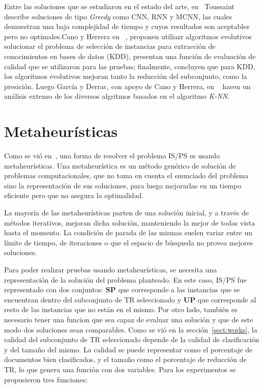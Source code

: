 \documentclass{ci5652}
\begin{document}
Entre las soluciones que se estudiaron en el estado del arte, en~\cite{toussaint2002proximity} Toussaint describe soluciones de tipo \textit{Greedy} como CNN, RNN y MCNN, las cuales demuestran una baja complejidad de tiempo y cuyos resultados son aceptables pero no optimales.Cano y Herrera en ~\cite{1255391}, proponen utiliazr algoritmos evolutivos solucionar el problema de selección de instancias para extracción de conocimientos en bases de datos (KDD), presentan una función de evaluación de calidad que se utilizaron para las pruebas; finalmente, concluyen que para KDD, los algoritmos evolutivos mejoran tanto la reducción del subconjunto, como la presición. Luego García y Derrac, con apoyo de Cano y Herrera, en ~\cite{garcia2012prototype} hacen un análisis extenso de los diversos algritmos basados en el algoritmo \textit{K-NN}.

\section{Metaheurísticas}
\label{sect:meta}

Como se vió en~\cite{1255391}, una forma de resolver el problema IS/PS es usando metaheurísticas. Una metaheurística es un método genérico de solución de problemas computacionales, que no toma en cuenta el enunciado del problema sino la representación de sus soluciones, para luego mejorarlas en un tiempo eficiente pero que no asegura la optimalidad.

La mayoría de las metaheurísticas parten de una solución inicial, y a través de métodos iterativos, mejoran dicha solución, manteniendo la mejor de todas vista hasta el momento. La condición de parada de las mismas suelen variar entre un límite de tiempo, de iteraciones o que el espacio de búsqueda no provea mejores soluciones.

Para poder realizar pruebas usando metaheurísticas, se necesita una representación de la solución del problema planteado. En este caso, IS/PS fue representado con dos conjuntos: \textbf{SP} que corresponde a las instancias que se encuentran dentro del subconjunto de TR seleccionado y \textbf{UP} que corresponde al resto de las instancias que no están en el mismo. Por otro lado, también es necesario tener una funcion que sea capaz de evaluar una solución y que de este modo dos soluciones sean comparables. Como se vió en la sección~\ref{sect:works}, la calidad del subconjunto de TR seleccionado depende de la calidad de clasificación y del tamaño del mismo. La calidad se puede representar como el porcentaje de documentos bien clasificados, y el tamaño como el porcentaje de reducción de TR, lo que genera una función con dos variables. Para los experimentos se propusieron tres funciones:
\end{document}
